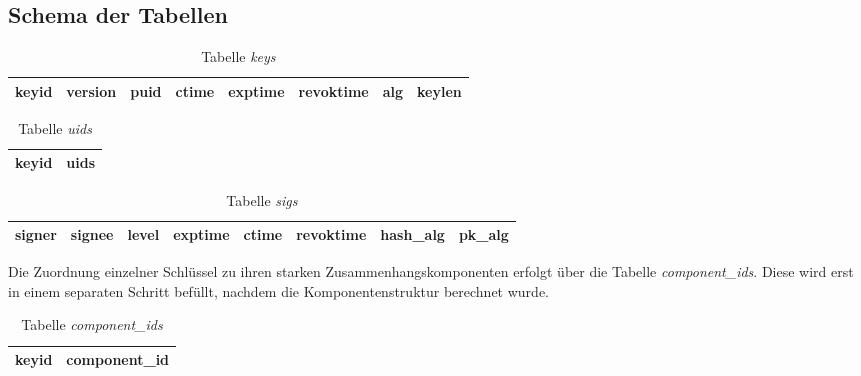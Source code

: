 \begin{appendix}
  \chapter{Schema der Tabellen}
  \label{sec:schema-der-tabellen}


  \begin{table}[ht!]
    \centering
    \begin{tabular}{|c|c|c|c|c|c|c|c|}
      \hline
      keyid & version & puid & ctime & exptime & revoktime & alg &
      keylen \\
      \hline
    \end{tabular}
    \caption{Tabelle \emph{keys}}
    \label{tab:keys}
  \end{table}

  \begin{table}[ht!]
    \centering
    \begin{tabular}{|c|c|}
      \hline
      keyid & uids \\
      \hline
    \end{tabular}
    \caption{Tabelle \emph{uids}}
    \label{tab:uids}
  \end{table}

  \begin{table}[ht!]
    \centering
    \begin{tabular}{|c|c|c|c|c|c|c|c|}
      \hline
      signer & signee & level & exptime & ctime & revoktime & hash\_alg
      & pk\_alg \\
      \hline
    \end{tabular}
    \caption{Tabelle \emph{sigs}}
    \label{tab:sigs}
  \end{table}

  Die Zuordnung einzelner Schlüssel zu ihren starken
  Zusammenhangskomponenten erfolgt über die Tabelle
  \emph{component\_ids}. Diese wird erst in einem separaten Schritt
  befüllt, nachdem die Komponentenstruktur berechnet wurde.

  \begin{table}[ht!]
    \centering
    \begin{tabular}{|c|c|}
      \hline
      keyid & component\_id \\
      \hline
    \end{tabular}
    \caption{Tabelle \emph{component\_ids}}
    \label{tab:component_ids}
  \end{table}


\end{appendix}
